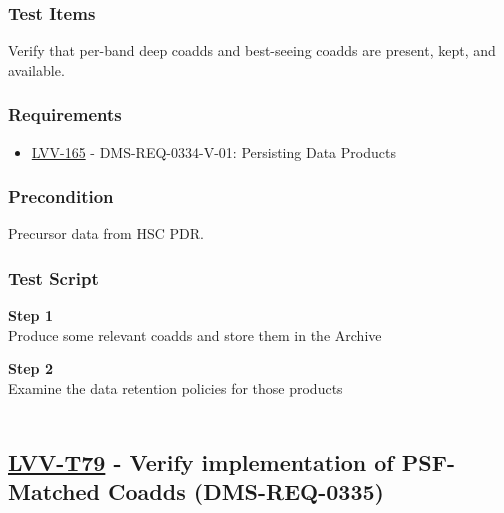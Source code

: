 \hypertarget{test-items-167}{%
\subsubsection{Test Items}\label{test-items-167}}

Verify that per-band deep coadds and best-seeing coadds are present,
kept, and available.

\hypertarget{requirements-168}{%
\subsubsection{Requirements}\label{requirements-168}}

\begin{itemize}
\tightlist
\item
  \href{https://jira.lsstcorp.org/browse/LVV-165}{LVV-165} -
  DMS-REQ-0334-V-01: Persisting Data Products
\end{itemize}

\hypertarget{precondition-8}{%
\subsubsection{Precondition}\label{precondition-8}}

Precursor data from HSC PDR.

\hypertarget{test-script-168}{%
\subsubsection{Test Script}\label{test-script-168}}

\textbf{Step 1}\\

\hypertarget{description-val}{}
Produce some relevant coadds and store them in the Archive

\textbf{Step 2}\\
Examine the data retention policies for those products\\
~\\

\hypertarget{lvv-t79---verify-implementation-of-psf-matched-coadds-dms-req-0335}{%
\subsection{\texorpdfstring{\href{https://jira.lsstcorp.org/secure/Tests.jspa\#/testCase/LVV-T79}{LVV-T79}
- Verify implementation of PSF-Matched Coadds
(DMS-REQ-0335)}{LVV-T79 - Verify implementation of PSF-Matched Coadds (DMS-REQ-0335)}}\label{lvv-t79---verify-implementation-of-psf-matched-coadds-dms-req-0335}}

